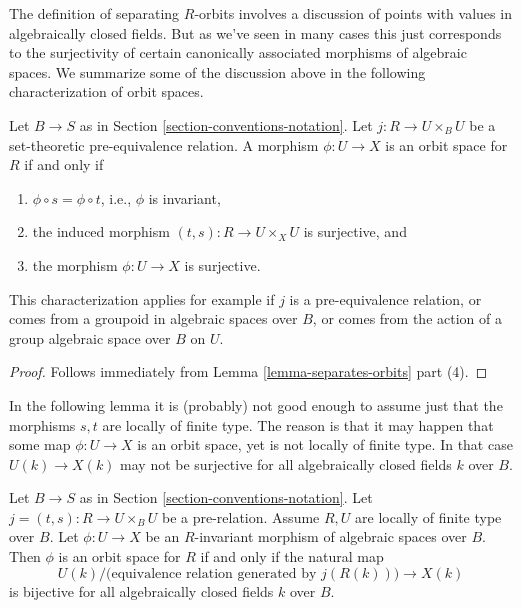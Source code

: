 \noindent
The definition of separating $R$-orbits involves a discussion of
points with values in algebraically closed fields. But as we've seen
in many cases this just corresponds to the surjectivity of certain
canonically associated morphisms of algebraic spaces.
We summarize some of the discussion above in the following characterization
of orbit spaces.

\begin{lemma}
\label{lemma-orbit-space}
Let $B \to S$ as in Section \ref{section-conventions-notation}.
Let $j : R \to U \times_B U$ be a set-theoretic pre-equivalence
relation. A morphism $\phi : U \to X$ is an orbit space for $R$ if and only if
\begin{enumerate}
\item $\phi \circ s = \phi \circ t$, i.e., $\phi$ is invariant,
\item the induced morphism $(t, s) : R \to U \times_X U$ is surjective, and
\item the morphism $\phi : U \to X$ is surjective.
\end{enumerate}
This characterization applies for example if $j$ is a pre-equivalence relation,
or comes from a groupoid in algebraic spaces over $B$, or comes from the action
of a group algebraic space over $B$ on $U$.
\end{lemma}

\begin{proof}
Follows immediately from Lemma \ref{lemma-separates-orbits} part (4).
\end{proof}

\noindent
In the following lemma it is (probably) not good enough to assume just that
the morphisms $s, t$ are locally of finite type. The reason is that
it may happen that some map $\phi : U \to X$ is an orbit space, yet is
not locally of finite type. In that case $U(k) \to X(k)$ may not
be surjective for all algebraically closed fields $k$ over $B$.

\begin{lemma}
\label{lemma-orbit-space-locally-finite-type-over-base}
Let $B \to S$ as in Section \ref{section-conventions-notation}.
Let $j = (t, s) : R \to U \times_B U$ be a pre-relation.
Assume $R, U$ are locally of finite type over $B$.
Let $\phi : U \to X$ be an $R$-invariant morphism of algebraic spaces over $B$.
Then $\phi$ is an orbit space for $R$ if and only if the natural map
$$
U(k)/\big(\text{equivalence relation generated by }j(R(k))\big)
\longrightarrow
X(k)
$$
is bijective for all algebraically closed fields $k$ over $B$.
\end{lemma}

